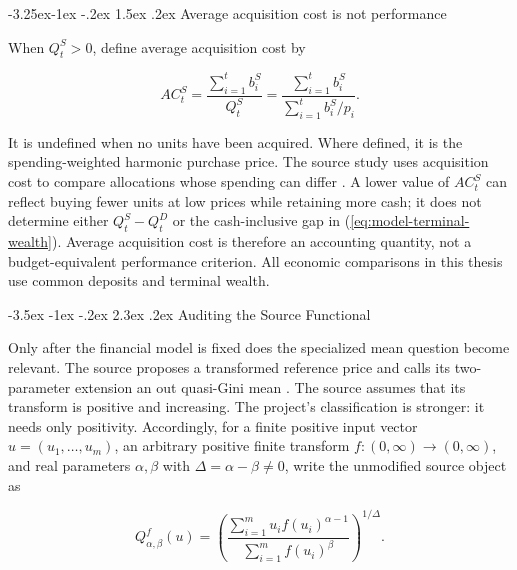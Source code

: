 \documentclass[12pt,a4paper,oneside]{report}
\makeatletter
\renewcommand\section{\@startsection{section}{1}{\z@}%
  {-3.5ex \@plus -1ex \@minus -.2ex}%
  {2.3ex \@plus .2ex}%
  {\normalfont\fontsize{14}{17}\selectfont\bfseries}}
\renewcommand\subsection{\@startsection{subsection}{2}{\z@}%
  {-3.25ex\@plus -1ex \@minus -.2ex}%
  {1.5ex \@plus .2ex}%
  {\normalfont\fontsize{12}{15}\selectfont\bfseries}}
\makeatother
\begin{document}
\subsection{Average acquisition cost is not performance}
\label{sec:accounting-quantities}

When $Q_t^S>0$, define average acquisition cost by

\begin{equation}
  AC_t^S=
  \frac{\sum_{i=1}^{t}b_i^S}{Q_t^S}
  =\frac{\sum_{i=1}^{t}b_i^S}
         {\sum_{i=1}^{t}b_i^S/p_i}.
  \label{eq:model-acquisition-cost}
\end{equation}

It is undefined when no units have been acquired. Where defined, it is the
spending-weighted harmonic purchase price. The source study uses acquisition
cost to compare allocations whose spending can differ
\citep{calvet2023smartdca}. A lower value of $AC_t^S$ can reflect buying fewer
units at low prices while retaining more cash; it does not determine either
$Q_t^S-Q_t^D$ or the cash-inclusive gap in
(\ref{eq:model-terminal-wealth}). Average acquisition cost is therefore an
accounting quantity, not a budget-equivalent performance criterion. All
economic comparisons in this thesis use common deposits and terminal wealth.

\section{Auditing the Source Functional}
\label{sec:source-functional-audit}

Only after the financial model is fixed does the specialized mean question
become relevant. The source proposes a transformed reference price and calls
its two-parameter extension an out quasi-Gini mean
\citep{calvet2023smartdca}. The source assumes that its transform is positive
and increasing. The project's classification is stronger: it needs only
positivity. Accordingly, for a finite positive input vector
$u=(u_1,\ldots,u_m)$, an arbitrary positive finite transform
$f:(0,\infty)\mathbin{\to}(0,\infty)$, and real parameters $\alpha,\beta$
with $\Delta=\alpha-\beta\neq0$, write the unmodified source object as

\begin{equation}
  Q_{\alpha,\beta}^{f}(u)
  =\left(
    \frac{\sum_{i=1}^{m}u_i f(u_i)^{\alpha-1}}
         {\sum_{i=1}^{m}f(u_i)^{\beta}}
   \right)^{1/\Delta}.
  \label{eq:source-functional}
\end{equation}
\end{document}
